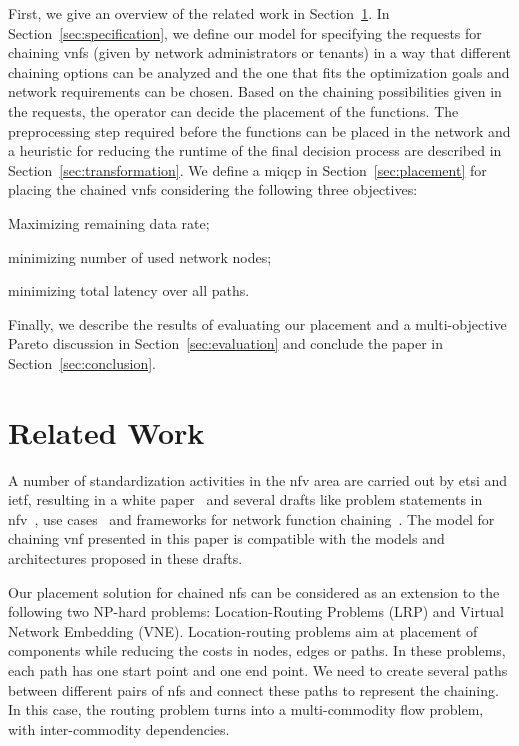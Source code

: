 \documentclass[10pt,a4paper,conference]{IEEEtran}
\begin{document}
First, we give an overview of the related work in Section~\ref{sec:relatedwork}.
In Section~\ref{sec:specification}, we define our model for specifying the requests for 
chaining \acp{vnf} (given by network administrators or tenants) in a
way that different chaining options can be analyzed 
and the one that fits the optimization goals and network requirements can be
chosen. 
Based on the chaining possibilities given in the requests, the operator
can decide the placement of the functions. The preprocessing step required
before the functions can be placed in the network and a heuristic
for reducing the runtime of the final decision process are described in 
Section~\ref{sec:transformation}. We define a \ac{miqcp} in Section~\ref{sec:placement} 
for placing the chained \acp{vnf} considering the following three objectives:
\begin{inparaenum}[1)]
 \item Maximizing remaining data rate;
 \item minimizing number of used network nodes;
 \item minimizing total latency over all paths.
\end{inparaenum}
Finally, we describe the results of evaluating our placement and a multi-objective
Pareto discussion in Section~\ref{sec:evaluation} and conclude the paper in 
Section~\ref{sec:conclusion}. 



\section{Related Work}
\label{sec:relatedwork}

A number of standardization activities in the \ac{nfv} area are carried out by 
\acs{etsi} and \acs{ietf}, resulting in a white paper~\cite{Introduction2012} and 
several drafts like problem statements in \ac{nfv}~\cite{draft-xjz-nfv-model-problem-statement-00, draft-ietf-sfc-problem-statement-05}, 
use cases~\cite{draft-liu-sfc-use-cases-05} and frameworks for network function chaining~\cite{draft-boucadair-sfc-framework-02}.
The model for chaining \ac{vnf} presented in this paper is compatible with the models and architectures proposed in these drafts.

Our placement solution for chained \acp{nf} can be considered as an extension to 
the following two NP-hard problems: Location-Routing Problems (LRP) and Virtual
Network Embedding (VNE). 
Location-routing problems \cite{Nagy2007,Prodhon2014} aim at placement of components 
while reducing the costs in nodes, edges or paths. 
In these problems, each path has one start point and one end point. We need to
create several paths between different pairs of \acp{nf} and connect these paths 
to represent the chaining. In this case, the routing problem turns into a multi-commodity 
flow problem, with inter-commodity dependencies.
\end{document}
